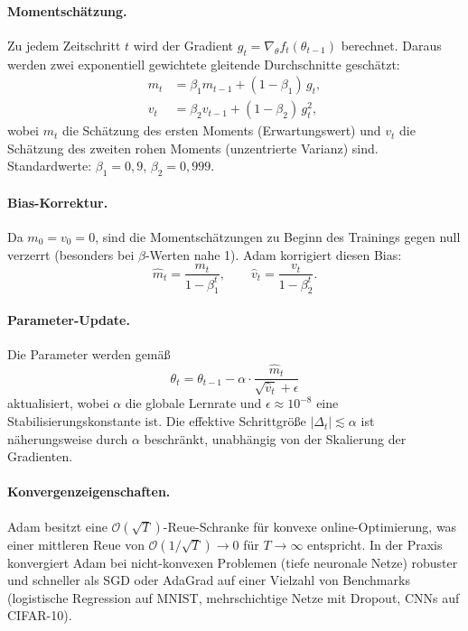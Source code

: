 \documentclass[a4paper,12pt]{article}
\begin{document}
\paragraph{Momentschätzung.}
Zu jedem Zeitschritt $t$ wird der Gradient $g_t = \nabla_\theta f_t(\theta_{t-1})$ berechnet.
Daraus werden zwei exponentiell gewichtete gleitende Durchschnitte geschätzt:
\begin{align}
    m_t &= \beta_1 m_{t-1} + (1 - \beta_1)\, g_t, \\
    v_t &= \beta_2 v_{t-1} + (1 - \beta_2)\, g_t^2,
\end{align}
wobei $m_t$ die Schätzung des ersten Moments (Erwartungswert) und $v_t$ die Schätzung des zweiten
rohen Moments (unzentrierte Varianz) sind. Standardwerte: $\beta_1 = 0{,}9$, $\beta_2 = 0{,}999$.

\paragraph{Bias-Korrektur.}
Da $m_0 = v_0 = 0$, sind die Momentschätzungen zu Beginn des Trainings gegen null verzerrt
(besonders bei $\beta$-Werten nahe 1). Adam korrigiert diesen Bias:
\[
    \hat{m}_t = \frac{m_t}{1 - \beta_1^t}, \qquad \hat{v}_t = \frac{v_t}{1 - \beta_2^t}.
\]

\paragraph{Parameter-Update.}
Die Parameter werden gemäß
\[
    \theta_t = \theta_{t-1} - \alpha \cdot \frac{\hat{m}_t}{\sqrt{\hat{v}_t} + \epsilon}
\]
aktualisiert, wobei $\alpha$ die globale Lernrate und $\epsilon \approx 10^{-8}$ eine
Stabilisierungskonstante ist. Die effektive Schrittgröße $|\Delta_t| \lesssim \alpha$ ist
näherungsweise durch $\alpha$ beschränkt, unabhängig von der Skalierung der Gradienten.

\paragraph{Konvergenzeigenschaften.}
Adam besitzt eine $\mathcal{O}(\sqrt{T})$-Reue-Schranke für konvexe online-Optimierung, was
einer mittleren Reue von $\mathcal{O}(1/\sqrt{T}) \to 0$ für $T \to \infty$ entspricht. In
der Praxis konvergiert Adam bei nicht-konvexen Problemen (tiefe neuronale Netze) robuster und
schneller als SGD oder AdaGrad auf einer Vielzahl von Benchmarks (logistische Regression auf
MNIST, mehrschichtige Netze mit Dropout, CNNs auf CIFAR-10).
\end{document}
